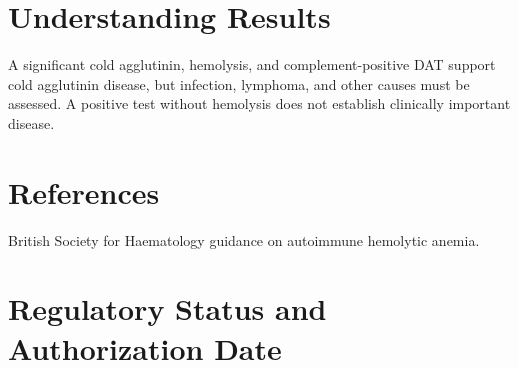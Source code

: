 \section*{Understanding Results}
A significant cold agglutinin, hemolysis, and complement-positive DAT support cold agglutinin disease, but infection, lymphoma, and other causes must be assessed. A positive test without hemolysis does not establish clinically important disease.

\section*{References}
British Society for Haematology guidance on autoimmune hemolytic anemia.

\clearpage


\section*{Regulatory Status and Authorization Date}

\clearpage

